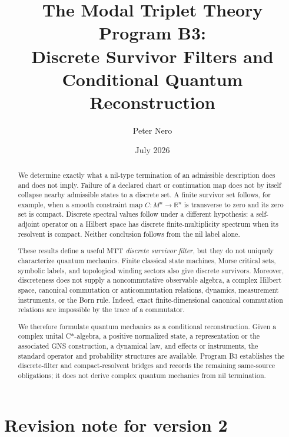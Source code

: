 \documentclass[11pt]{article}
\title{The Modal Triplet Theory Program B3:\\
Discrete Survivor Filters and Conditional Quantum Reconstruction}
\author{Peter Nero}
\date{July 2026}
\begin{document}
\maketitle

\begin{abstract}
We determine exactly what a nil-type termination of an admissible description
does and does not imply.  Failure of a declared chart or continuation map does
not by itself collapse nearby admissible states to a discrete set.  A finite
survivor set follows, for example, when a smooth constraint map
$C:M^n\to\mathbb R^n$ is transverse to zero and its zero set is compact.
Discrete spectral values follow under a different hypothesis: a self-adjoint
operator on a Hilbert space has discrete finite-multiplicity spectrum when its
resolvent is compact.  Neither conclusion follows from the nil label alone.

These results define a useful MTT \emph{discrete survivor filter}, but they do
not uniquely characterize quantum mechanics.  Finite classical state
machines, Morse critical sets, symbolic labels, and topological winding
sectors also give discrete survivors.  Moreover, discreteness does not supply
a noncommutative observable algebra, a complex Hilbert space, canonical
commutation or anticommutation relations, dynamics, measurement instruments,
or the Born rule.  Indeed, exact finite-dimensional canonical commutation
relations are impossible by the trace of a commutator.

We therefore formulate quantum mechanics as a conditional reconstruction.
Given a complex unital C*-algebra, a positive normalized state, a
representation or the associated GNS construction, a dynamical law, and
effects or instruments, the standard operator and probability structures are
available.  Program B3 establishes the discrete-filter and compact-resolvent
bridges and records the remaining same-source obligations; it does not derive
complex quantum mechanics from nil termination.
\end{abstract}

\section*{Revision note for version 2}
\end{document}
